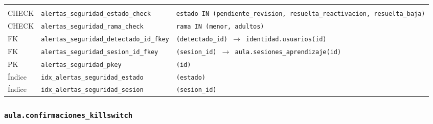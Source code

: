 {\small
\begin{xltabular}{\textwidth}{@{}>{\raggedright\arraybackslash}p{1.7cm} >{\raggedright\arraybackslash}p{4.6cm} L@{}}
    \toprule
     &  &  \\
    \midrule
    \endfirsthead
    \toprule
     &  &  \\
    \midrule
    \endhead
    \bottomrule
    \endfoot
    CHECK & \texttt{alertas\_\allowbreak{}seguridad\_\allowbreak{}estado\_\allowbreak{}check} & \texttt{estado IN (\allowbreak{}\textquotesingle{}pendiente\_\allowbreak{}revision\textquotesingle{},\allowbreak{} \textquotesingle{}resuelta\_\allowbreak{}reactivacion\textquotesingle{},\allowbreak{} \textquotesingle{}resuelta\_\allowbreak{}baja\textquotesingle{})} \\
    CHECK & \texttt{alertas\_\allowbreak{}seguridad\_\allowbreak{}rama\_\allowbreak{}check} & \texttt{rama IN (\allowbreak{}\textquotesingle{}menor\textquotesingle{},\allowbreak{} \textquotesingle{}adultos\textquotesingle{})} \\
    FK & \texttt{alertas\_\allowbreak{}seguridad\_\allowbreak{}detectado\_\allowbreak{}id\_\allowbreak{}fkey} & \texttt{(\allowbreak{}detectado\_\allowbreak{}id) $\rightarrow$ identidad.usuarios(\allowbreak{}id)} \\
    FK & \texttt{alertas\_\allowbreak{}seguridad\_\allowbreak{}sesion\_\allowbreak{}id\_\allowbreak{}fkey} & \texttt{(\allowbreak{}sesion\_\allowbreak{}id) $\rightarrow$ aula.sesiones\_\allowbreak{}aprendizaje(\allowbreak{}id)} \\
    PK & \texttt{alertas\_\allowbreak{}seguridad\_\allowbreak{}pkey} & \texttt{(\allowbreak{}id)} \\
    Índice & \texttt{idx\_\allowbreak{}alertas\_\allowbreak{}seguridad\_\allowbreak{}estado} & \texttt{(\allowbreak{}estado)} \\
    Índice & \texttt{idx\_\allowbreak{}alertas\_\allowbreak{}seguridad\_\allowbreak{}sesion} & \texttt{(\allowbreak{}sesion\_\allowbreak{}id)} \\
\end{xltabular}
}

\subsubsection{\texorpdfstring{\texttt{aula.confirmaciones\_\allowbreak{}killswitch}}{aula.confirmaciones\_killswitch}}\label{dd:aula.confirmaciones_killswitch}

